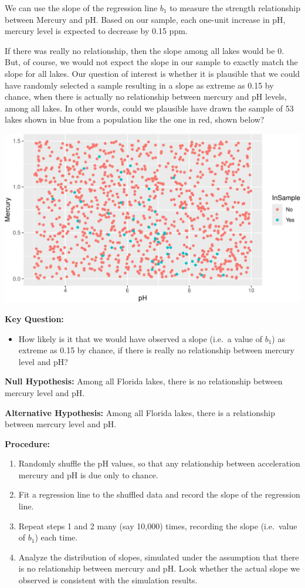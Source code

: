 \documentclass[
  letterpaper,
  DIV=11,
  numbers=noendperiod]{scrreprt}
\providecommand{\tightlist}{%
  \setlength{\itemsep}{0pt}\setlength{\parskip}{0pt}}\usepackage{longtable,booktabs,array}
\begin{document}
We can use the slope of the regression line \(b_1\) to measure the
strength relationship between Mercury and pH. Based on our sample, each
one-unit increase in pH, mercury level is expected to decrease by 0.15
ppm.

If there was really no relationship, then the slope among all lakes
would be 0. But, of course, we would not expect the slope in our sample
to exactly match the slope for all lakes. Our question of interest is
whether it is plausible that we could have randomly selected a sample
resulting in a slope as extreme as 0.15 by chance, when there is
actually no relationship between mercury and pH levels, among all lakes.
In other words, could we plausible have drawn the sample of 53 lakes
shown in blue from a population like the one in red, shown below?

\includegraphics{Ch3_files/figure-pdf/unnamed-chunk-213-1.pdf}

\textbf{Key Question:}

\begin{itemize}
\tightlist
\item
  How likely is it that we would have observed a slope (i.e.~a value of
  \(b_1\)) as extreme as 0.15 by chance, if there is really no
  relationship between mercury level and pH?
\end{itemize}

\textbf{Null Hypothesis:} Among all Florida lakes, there is no
relationship between mercury level and pH.

\textbf{Alternative Hypothesis:} Among all Florida lakes, there is a
relationship between mercury level and pH.

\textbf{Procedure:}

\begin{enumerate}
\def\labelenumi{\arabic{enumi}.}
\item
  Randomly shuffle the pH values, so that any relationship between
  acceleration mercury and pH is due only to chance.
\item
  Fit a regression line to the shuffled data and record the slope of the
  regression line.
\item
  Repeat steps 1 and 2 many (say 10,000) times, recording the slope
  (i.e.~value of \(b_1\)) each time.
\item
  Analyze the distribution of slopes, simulated under the assumption
  that there is no relationship between mercury and pH. Look whether the
  actual slope we observed is consistent with the simulation results.
\end{enumerate}
\end{document}
